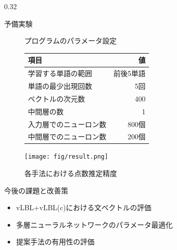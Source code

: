 \documentclass[8pt,unicode]{beamer}
\newcommand{\columnscale}{0.32}
\begin{document}
\begin{frame}{}
\begin{columns}[t]
\begin{column}{\columnscale\textwidth}
\begin{block}{予備実験}
    \vspace{-2em}
    \begin{figure}
      \centering
      \begin{minipage}[t]{0.45\textwidth}
        \centering
        \small
        \caption{\small プログラムのパラメータ設定}
        \begin{tabular}{l | r}
          項目 & 値 \\
          \hline
          学習する単語の範囲 & 前後5単語 \\
          単語の最少出現回数 & 5回 \\
          ベクトルの次元数 & 400 \\
          中間層の数 & 1 \\
          入力層でのニューロン数 & 800個 \\
          中間層でのニューロン数 & 200個
        \end{tabular}
      \end{minipage}\hfill
      \begin{minipage}[t]{0.45\textwidth}
        \centering
        \vspace{0em}
        \texttt{[image: fig/result.png]}
        \caption{\small 各手法における点数推定精度}
      \end{minipage}
    \end{figure}
  \end{block} %

  \begin{block}{今後の課題と改善策}
    \begin{itemize}
      \item vLBL+vLBL(c)における文ベクトルの評価
      \item 多層ニューラルネットワークのパラメータ最適化
      \item 提案手法の有用性の評価
    \end{itemize}
  \end{block} %


\end{column}
\end{columns}
\end{frame}
\end{document}
